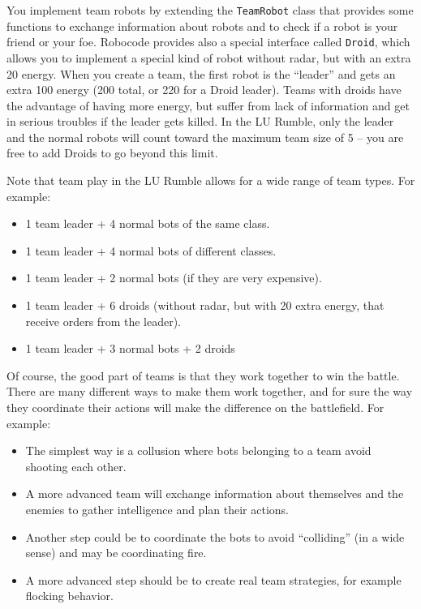 \documentclass{scrreprt}
\begin{document}
You implement team robots by extending the \texttt{TeamRobot} class that provides some functions to exchange information about robots and to check if a robot is your friend or your foe. Robocode provides also a special interface called \texttt{Droid}, which allows you to implement a special kind of robot without radar, but with an extra 20 energy. When you create a team, the first robot is the ``leader'' and gets an extra 100 energy (200 total, or 220 for a Droid leader). Teams with droids have the advantage of having more energy, but suffer from lack of information and get in serious troubles if the leader gets killed. In the LU Rumble, only the leader and the normal robots will count toward the maximum team size of 5 -- you are free to add Droids to go beyond this limit.

Note that team play in the LU Rumble allows for a wide range of team types. For example:
\begin{itemize}
\item 1 team leader + 4 normal bots of the same class.
\item 1 team leader + 4 normal bots of different classes.
\item 1 team leader + 2 normal bots (if they are very expensive).
\item 1 team leader + 6 droids (without radar, but with 20 extra energy, that receive orders from the leader).
\item 1 team leader + 3 normal bots + 2 droids
\end{itemize}

Of course, the good part of teams is that they work together to win the battle. There are many different ways to make them work together, and for sure the way they coordinate their actions will make the difference on the battlefield. For example:

\begin{itemize}
\item The simplest way is a collusion where bots belonging to a team avoid shooting each other.
\item A more advanced team will exchange information about themselves and the enemies to gather intelligence and plan their actions.
\item Another step could be to coordinate the bots to avoid ``colliding'' (in a wide sense) and may be coordinating fire.
\item A more advanced step should be to create real team strategies, for example flocking behavior. 
\end{itemize}
    
\end{document}
